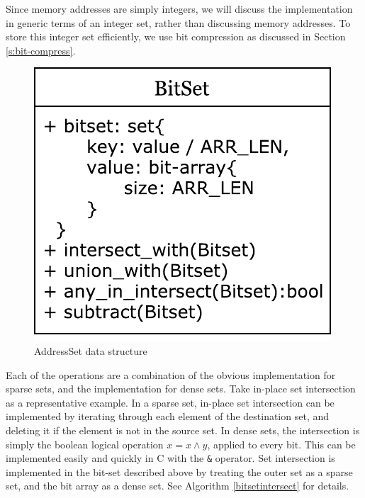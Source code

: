 \documentclass[12pt,twoside]{reedthesis}
\begin{document}
			
			Since memory addresses are simply integers, we will discuss the implementation in generic terms of an integer set, rather than discussing memory addresses. To store this integer set efficiently, we use bit compression as discussed in Section \ref{s:bit-compress}.
			
			\begin{figure}[H]
				\caption{AddressSet data structure}
				\label{fig:bitset}
				\includegraphics[scale=0.8]{bit_data.pdf}
			\end{figure}
			
			
			
		
			Each of the operations are a combination of the obvious implementation for sparse sets, and the implementation for dense sets. Take in-place set intersection as a representative example. In a sparse set, in-place set intersection can be implemented by iterating through each element of the destination set, and deleting it if the element is not in the source set. In dense sets, the intersection is simply the boolean logical operation $x = x \land y$, applied to every bit. This can be implemented easily and quickly in C with the \texttt{\&} operator. Set intersection is implemented in the bit-set described above by treating the outer set as a sparse set, and the bit array as a dense set. See Algorithm \ref{bitsetintersect} for details. %
			
\end{document}
